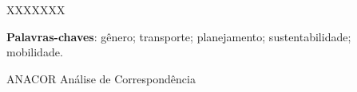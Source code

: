 \documentclass[
  12pt,        %
  openright,      %
  twoside,      %
  a4paper,      %
  english,      %
  brazil        %
]{abntex2}
\begin{document}

\setlength{\absparsep}{18pt} %
\begin{resumo}

XXXXXXX

 \textbf{Palavras-chaves}: gênero; transporte; planejamento; sustentabilidade; mobilidade.
\end{resumo}

%
%

%

%

\listoffigures*
\cleardoublepage

\listofquadros*

\listoftables*
\cleardoublepage


\begin{siglas}
  \item[ANACOR] Análise de Correspondência


\end{siglas}
\end{document}
